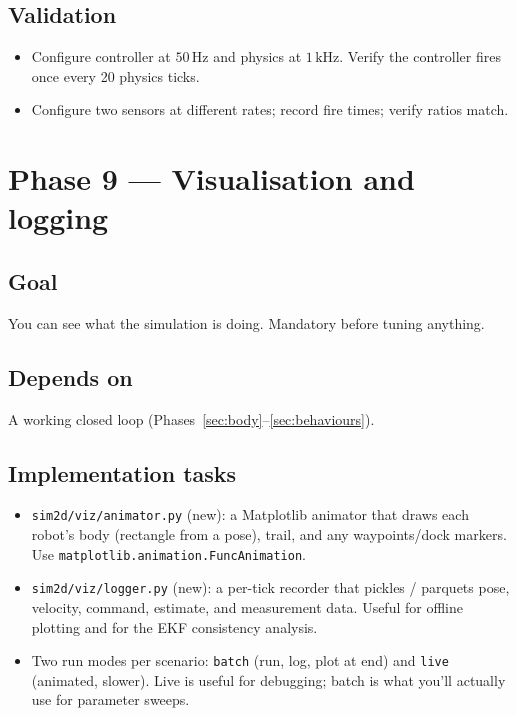 \documentclass[11pt,a4paper]{article}
\newcommand{\code}[1]{\texttt{\small #1}}
\newcommand{\file}[1]{\texttt{\small #1}}
\begin{document}
\subsection*{Validation}

\begin{itemize}
    \item Configure controller at $50\,\text{Hz}$ and physics at
        $1\,\text{kHz}$. Verify the controller fires once every 20 physics
        ticks.
    \item Configure two sensors at different rates; record fire times;
        verify ratios match.
\end{itemize}

\section{Phase 9 --- Visualisation and logging}
\label{sec:viz}

\subsection*{Goal}
You can see what the simulation is doing. Mandatory before tuning anything.

\subsection*{Depends on}
A working closed loop (Phases~\ref{sec:body}--\ref{sec:behaviours}).

\subsection*{Implementation tasks}

\begin{itemize}
    \item \file{sim2d/viz/animator.py} (new): a Matplotlib animator that
        draws each robot's body (rectangle from a pose), trail, and any
        waypoints/dock markers. Use \code{matplotlib.animation.FuncAnimation}.
    \item \file{sim2d/viz/logger.py} (new): a per-tick recorder that pickles
        / parquets pose, velocity, command, estimate, and measurement
        data. Useful for offline plotting and for the EKF consistency
        analysis.
    \item Two run modes per scenario: \code{batch} (run, log, plot at end)
        and \code{live} (animated, slower). Live is useful for debugging;
        batch is what you'll actually use for parameter sweeps.
\end{itemize}
\end{document}
